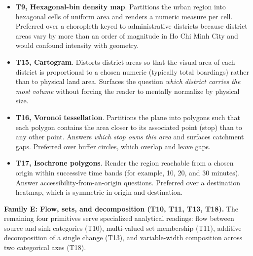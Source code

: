 \begin{itemize}
\item \textbf{T9, Hexagonal-bin density map}. Partitions the urban
region into hexagonal cells of uniform area and renders a numeric
measure per cell. Preferred over a choropleth keyed to administrative
districts because district areas vary by more than an order of
magnitude in Ho Chi Minh City and would confound intensity with
geometry.
\item \textbf{T15, Cartogram}. Distorts district areas so that the
visual area of each district is proportional to a chosen numeric
(typically total boardings) rather than to physical land area.
Surfaces the question \emph{which district carries the most volume}
without forcing the reader to mentally normalize by physical size.
\item \textbf{T16, Voronoi tessellation}. Partitions the plane
into polygons such that each polygon contains the area closer to its
associated point (stop) than to any other point. Answers \emph{which
stop owns this area} and surfaces catchment gaps. Preferred over
buffer circles, which overlap and leave gaps.
\item \textbf{T17, Isochrone polygons}. Render the region
reachable from a chosen origin within successive time bands (for
example, 10, 20, and 30 minutes). Answer accessibility-from-an-origin
questions. Preferred over a destination heatmap, which is symmetric
in origin and destination.
\end{itemize}

\textbf{Family E: Flow, sets, and decomposition (T10, T11, T13, T18).}
The remaining four primitives serve specialized analytical readings:
flow between source and sink categories (T10), multi-valued set
membership (T11), additive decomposition of a single change (T13),
and variable-width composition across two categorical axes (T18).

